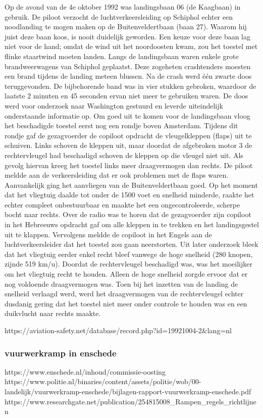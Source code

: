 Op de avond van de 4e oktober 1992 was landingsbaan 06 (de Kaagbaan) in gebruik. De piloot verzocht de luchtverkeersleiding op Schiphol echter een noodlanding te mogen maken op de Buitenveldertbaan (baan 27). Waarom hij juist deze baan koos, is nooit duidelijk geworden. Een keuze voor deze baan lag niet voor de hand; omdat de wind uit het noordoosten kwam, zou het toestel met flinke staartwind moeten landen. Langs de landingsbaan waren enkele grote brandweerwagens van Schiphol geplaatst. Deze zogeheten crashtenders moesten een brand tijdens de landing meteen blussen. Na de crash werd één zwarte doos teruggevonden. De bijbehorende band was in vier stukken gebroken, waardoor de laatste 2 minuten en 45 seconden ervan niet meer te gebruiken waren. De doos werd voor onderzoek naar Washington gestuurd en leverde uiteindelijk onderstaande informatie op.
Om goed uit te komen voor de landingsbaan vloog het beschadigde toestel eerst nog een rondje boven Amsterdam. Tijdens dit rondje gaf de gezagvoerder de copiloot opdracht de vleugelkleppen (flaps) uit te schuiven. Links schoven de kleppen uit, maar doordat de afgebroken motor 3 de rechtervleugel had beschadigd schoven de kleppen op die vleugel niet uit. Als gevolg hiervan kreeg het toestel links meer draagvermogen dan rechts. De piloot meldde aan de verkeersleiding dat er ook problemen met de flaps waren.
Aanvankelijk ging het aanvliegen van de Buitenveldertbaan goed. Op het moment dat het vliegtuig daalde tot onder de 1500 voet en snelheid minderde, raakte het echter compleet onbestuurbaar en maakte het een ongecontroleerde, scherpe bocht naar rechts. Over de radio was te horen dat de gezagvoerder zijn copiloot in het Hebreeuws opdracht gaf om alle kleppen in te trekken en het landingsgestel uit te klappen. Vervolgens meldde de copiloot in het Engels aan de luchtverkeersleider dat het toestel zou gaan neerstorten. Uit later onderzoek bleek dat het vliegtuig eerder enkel recht bleef vanwege de hoge snelheid (280 knopen, zijnde 519 km/u). Doordat de rechtervleugel beschadigd was, was het moeilijker om het vliegtuig recht te houden. Alleen de hoge snelheid zorgde ervoor dat er nog voldoende draagvermogen was. Toen bij het inzetten van de landing de snelheid verlaagd werd, werd het draagvermogen van de rechtervleugel echter dusdanig gering dat het toestel niet meer onder controle te houden was en een duikvlucht naar rechts maakte.

https://aviation-safety.net/database/record.php?id=19921004-2&lang=nl 
\subsubsection{vuurwerkramp in enschede }
https://www.enschede.nl/inhoud/commissie-oosting 
https://www.politie.nl/binaries/content/assets/politie/wob/00-landelijk/vuurwerkramp-enschede/bijlagen-rapport-vuurwerkramp-enschede.pdf 
https://www.researchgate.net/publication/254815008_Rampen_regels_richtlijnen 


